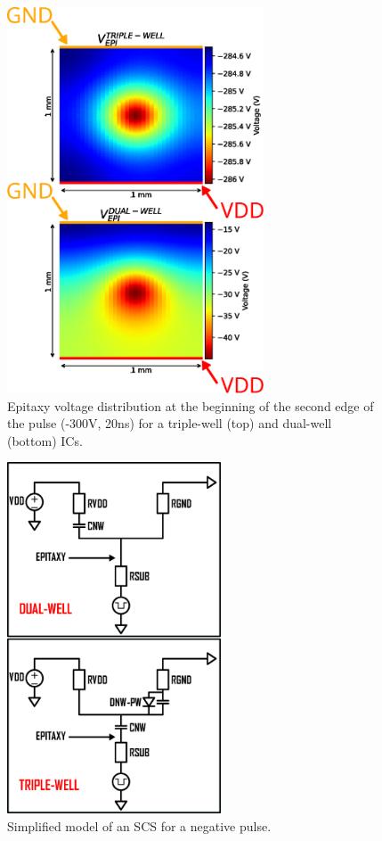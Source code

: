 \documentclass[10pt, conference, compsocconf]{IEEEtran}
\begin{document}
\begin{figure}[!ht]
\centering
\includegraphics[width=3in]{EPI_VOLT_TR_du.eps}
\caption{Epitaxy voltage distribution at the beginning of the second edge of the pulse (-300V, 20ns) for a triple-well (top) and dual-well (bottom) ICs.}
\label{fig_epi_tw_dw}
\end{figure}
\begin{figure}[!ht]
\centering
\includegraphics[width=2.5in]{triple-well-grossier-negatif.eps}
\caption{Simplified model of an SCS for a negative pulse.}
\label{fig_epi_gross}
\end{figure}
\end{document}
